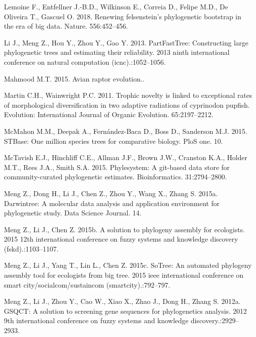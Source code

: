 \documentclass[]{article}
\begin{document}
\leavevmode\hypertarget{ref-lemoine2018renewing}{}%
Lemoine F., Entfellner J.-B.D., Wilkinson E., Correia D., Felipe M.D., De Oliveira T., Gascuel O. 2018. Renewing felsenstein's phylogenetic bootstrap in the era of big data. Nature. 556:452--456.

\leavevmode\hypertarget{ref-li2013partfasttree}{}%
Li J., Meng Z., Hou Y., Zhou Y., Gao Y. 2013. PartFastTree: Constructing large phylogenetic trees and estimating their reliability. 2013 ninth international conference on natural computation (icnc).:1052--1056.

\leavevmode\hypertarget{ref-mahmood2015avian}{}%
Mahmood M.T. 2015. Avian raptor evolution..

\leavevmode\hypertarget{ref-martin2011trophic}{}%
Martin C.H., Wainwright P.C. 2011. Trophic novelty is linked to exceptional rates of morphological diversification in two adaptive radiations of cyprinodon pupfish. Evolution: International Journal of Organic Evolution. 65:2197--2212.

\leavevmode\hypertarget{ref-mcmahon2015stbase}{}%
McMahon M.M., Deepak A., Fernández-Baca D., Boss D., Sanderson M.J. 2015. STBase: One million species trees for comparative biology. PloS one. 10.

\leavevmode\hypertarget{ref-mctavish2015phylesystem}{}%
McTavish E.J., Hinchliff C.E., Allman J.F., Brown J.W., Cranston K.A., Holder M.T., Rees J.A., Smith S.A. 2015. Phylesystem: A git-based data store for community-curated phylogenetic estimates. Bioinformatics. 31:2794--2800.

\leavevmode\hypertarget{ref-meng2015darwintree}{}%
Meng Z., Dong H., Li J., Chen Z., Zhou Y., Wang X., Zhang S. 2015a. Darwintree: A molecular data analysis and application environment for phylogenetic study. Data Science Journal. 14.

\leavevmode\hypertarget{ref-meng2015solution}{}%
Meng Z., Li J., Chen Z. 2015b. A solution to phylogeny assembly for ecologists. 2015 12th international conference on fuzzy systems and knowledge discovery (fskd).:1103--1107.

\leavevmode\hypertarget{ref-meng2015sotree}{}%
Meng Z., Li J., Yang T., Lin L., Chen Z. 2015c. SoTree: An automated phylogeny assembly tool for ecologists from big tree. 2015 ieee international conference on smart city/socialcom/sustaincom (smartcity).:792--797.

\leavevmode\hypertarget{ref-meng2012gsqct}{}%
Meng Z., Li J., Zhou Y., Cao W., Xiao X., Zhao J., Dong H., Zhang S. 2012a. GSQCT: A solution to screening gene sequences for phylogenetics analysis. 2012 9th international conference on fuzzy systems and knowledge discovery.:2929--2933.
\end{document}
